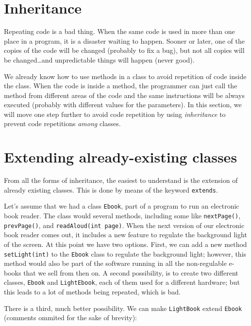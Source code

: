 \section{Inheritance}
\label{sec:inheritance-1}

Repeating code is a bad thing. When the same code is used in more than
one place in a program, it is a disaster waiting to happen. Sooner or
later, one of the copies of the code will be changed (probably to fix
a bug), but not all copies will be changed\ldots and unpredictable things
will happen (never good). 

We already know how to use methods in a class to avoid repetition of
code inside the class. When the code is inside a method, the
programmer can just call the method from different areas of the code
and the same instructions will be always executed (probably with
different values for the parameters). In this section, we will move
one step further to avoid code repetition by using \emph{inheritance} to
prevent code repetitions \emph{among} classes. 

\section{Extending already-existing classes}
\label{sec:extend-alre-exist}

From all the forms of inheritance, the easiest to understand is the
extension of already existing classes. This is done by means of the
keyword \verb+extends+. 

Let's assume that we had a class \verb+Ebook+,
part of a program to run an electronic book reader. The class would
several methods, including some like \verb+nextPage()+,
\verb+prevPage()+, and \verb+readAloud(int page)+. When the next
version of our electronic book reader comes out, it includes a new
feature to regulate the background light of the screen. At this point
we have two options. First, we can add a new method
\verb+setLight(int)+ to the \verb+Ebook+ class to regulate the
background light; however, this method would also be part of the
software running in all the non-regulable e-books that we sell from
then on. A second possibility, is to create two different classes,
\verb+Ebook+ and \verb+LightEbook+, each of them used for a different
hardware; but this leads to a lot of methods being repeated, which is
bad. 

There is a third, much better possibility. We can make
\verb+LightBook+ extend \verb+Ebook+ (comments ommited for the sake of
brevity): 

